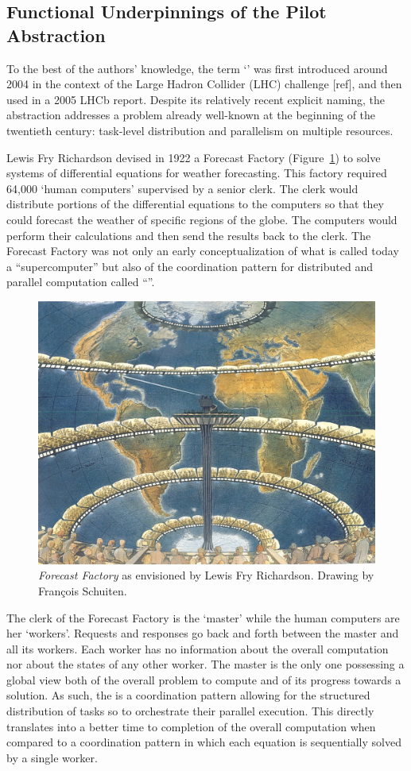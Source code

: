 \documentclass{sig-alternate}
\begin{document}
\subsection{Functional Underpinnings of the Pilot Abstraction}
\label{sec:histabstr}

To the best of the authors' knowledge, the term `\pilotjob' was first introduced
around 2004 in the context of the Large Hadron Collider (LHC) challenge [ref],
and then used in a 2005 LHCb report\cite{lhcb2005}. Despite its relatively
recent explicit naming, the \pilot abstraction addresses a problem already
well-known at the beginning of the twentieth century: task-level distribution
and parallelism on multiple resources.

Lewis Fry Richardson devised in 1922 a Forecast Factory
(Figure~\ref{fig:figures_forecast-factory}) to solve systems of differential
equations for weather forecasting. This factory required 64,000 `human
computers' supervised by a senior clerk. The clerk would distribute portions of
the differential equations to the computers so that they could forecast the
weather of specific regions of the globe. The computers would perform their
calculations and then send the results back to the clerk. The Forecast Factory
was not only an early conceptualization of what is called today a
``supercomputer'' but also of the coordination pattern for distributed and
parallel computation called ``\MW''.

\begin{figure}[t]
  \centering
    \includegraphics[width=.45\textwidth]{figures/forecast-factory.jpg}
  \caption{\textit{Forecast Factory} as envisioned by Lewis Fry Richardson.
    Drawing by Fran{\c c}ois Schuiten.}
  \label{fig:figures_forecast-factory}
\end{figure}

The clerk of the Forecast Factory is the `master' while the human computers are
her `workers'. Requests and responses go back and forth between the master and
all its workers. Each worker has no information about the overall computation
nor about the states of any other worker. The master is the only one possessing
a global view both of the overall problem to compute and of its progress towards
a solution. As such, the \MW is a coordination pattern allowing for the
structured distribution of tasks so to orchestrate their parallel execution.
This directly translates into a better time to completion of the overall
computation when compared to a coordination pattern in which each equation is
sequentially solved by a single worker.
\end{document}
